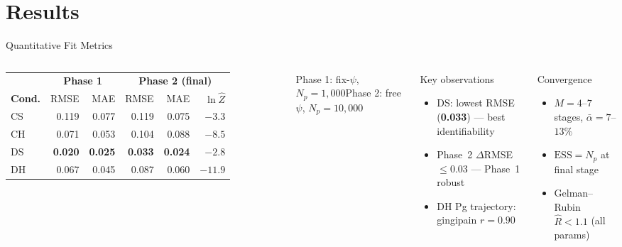 \documentclass[aspectratio=169,10pt]{beamer}
\newcommand{\hlnum}[1]{\textcolor{ikm}{\textbf{#1}}}
\begin{document}
\section{Results}

\begin{frame}[t]{Quantitative Fit Metrics}
  \small
  \begin{columns}[T]
      \centering
      \vspace{2pt}
      \begin{tabular}{@{}l
          r r
          r r r@{}}
        \toprule
        & \multicolumn{2}{c}{\textbf{Phase 1}} & \multicolumn{3}{c}{\textbf{Phase 2 (final)}}\\
        \cmidrule(lr){2-3}\cmidrule(lr){4-6}
        \textbf{Cond.} & RMSE & MAE & RMSE & MAE & $\ln\hat{Z}$\\
        \midrule
        CS & 0.119 & 0.077 & 0.119 & 0.075 & $-3.3$\\
        CH & 0.071 & 0.053 & 0.104 & 0.088 & $-8.5$\\
        DS & \textbf{0.020} & \textbf{0.025} & \textbf{0.033} & \textbf{0.024} & $\mathbf{-2.8}$\\
        DH & 0.067 & 0.045 & 0.087 & 0.060 & $-11.9$\\
        \bottomrule
      \end{tabular}
      \vspace{4pt}
      {\scriptsize Phase 1: fix-$\psi$, $N_p=1{,}000$\quad Phase 2: free $\psi$, $N_p=10{,}000$}
      \vspace{2pt}
      \begin{block}{Key observations}
        \begin{itemize}\setlength{\itemsep}{3pt}
          \item DS: lowest RMSE (\hlnum{0.033}) — best identifiability
          \item Phase~2 $\Delta$RMSE $\leq 0.03$ — Phase~1 robust
          \item DH Pg trajectory: gingipain $r=0.90$
        \end{itemize}
      \end{block}
      \vspace{4pt}
      \begin{block}{Convergence}
        \begin{itemize}\setlength{\itemsep}{3pt}
          \item $M=4$--$7$ stages, $\bar\alpha=7$--$13\%$
          \item $\mathrm{ESS}=N_p$ at final stage
          \item Gelman--Rubin $\hat{R}<1.1$ (all params)
        \end{itemize}
      \end{block}
  \end{columns}
\end{frame}
\end{document}
